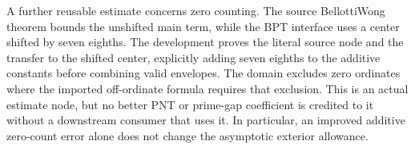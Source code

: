 \documentclass[11pt]{article}
\begin{document}
A further reusable estimate concerns zero counting. The source BellottiWong theorem bounds the unshifted main term, while the BPT interface uses a center shifted by seven eighths. The development proves the literal source node and the transfer to the shifted center, explicitly adding seven eighths to the additive constants before combining valid envelopes. The domain excludes zero ordinates where the imported off-ordinate formula requires that exclusion. This is an actual estimate node, but no better PNT or prime-gap coefficient is credited to it without a downstream consumer that uses it. In particular, an improved additive zero-count error alone does not change the asymptotic exterior allowance.


\begin{center}


\ifdim\wd\eqbox>\linewidth\resizebox{\linewidth}{!}{\usebox{\eqbox}}\else\usebox{\eqbox}\fi

\end{center}

\begin{center}


\ifdim\wd\eqbox>\linewidth\resizebox{\linewidth}{!}{\usebox{\eqbox}}\else\usebox{\eqbox}\fi

\end{center}

\begin{center}


\ifdim\wd\eqbox>\linewidth\resizebox{\linewidth}{!}{\usebox{\eqbox}}\else\usebox{\eqbox}\fi

\end{center}

\begin{center}


\ifdim\wd\eqbox>\linewidth\resizebox{\linewidth}{!}{\usebox{\eqbox}}\else\usebox{\eqbox}\fi

\end{center}
\end{document}
